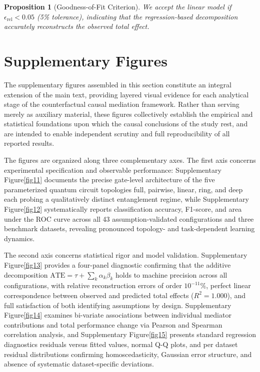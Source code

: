\documentclass[
    reprint,
    amsmath, amssymb,
    aps,
    floatfix,
    nofootinbib
]{revtex4-1}
\newtheorem{proposition}{Proposition}
\begin{document}
\begin{proposition}[Goodness-of-Fit Criterion]
We accept the linear model if $\epsilon_{\text{rel}} < 0.05$ (5\% tolerance), indicating that the regression-based decomposition accurately reconstructs the observed total effect.
\end{proposition}

\section{Supplementary Figures}

The supplementary figures assembled in this section constitute 
an integral extension of the main text, providing layered visual evidence for each analytical stage of the counterfactual causal mediation framework. Rather than serving merely as auxiliary material, these figures collectively establish the empirical and statistical foundations upon which the causal conclusions of the study rest, and are intended to enable independent scrutiny and full reproducibility of all reported results.

The figures are organized along three complementary axes. 
The first axis concerns experimental specification and 
observable performance: Supplementary Figure\ref{fig11} documents 
the precise gate-level architecture of the five parameterized 
quantum circuit topologies full, pairwise, linear, ring, 
and deep  each probing a qualitatively distinct entanglement 
regime, while Supplementary Figure\ref{fig12} systematically reports 
classification accuracy, F1-score, and area under the ROC 
curve across all 43 assumption-validated configurations and 
three benchmark datasets, revealing pronounced topology- and 
task-dependent learning dynamics.

The second axis concerns statistical rigor and model 
validation. Supplementary Figure\ref{fig13} provides a four-panel 
diagnostic confirming that the additive decomposition 
$\mathrm{ATE} = \tau + \sum_k \alpha_k \beta_k$ holds 
to machine precision across all configurations, with 
relative reconstruction errors of order $10^{-11}\%$, 
perfect linear correspondence between observed and 
predicted total effects ($R^2 = 1.000$), and full 
satisfaction of both identifying assumptions by design. 
Supplementary Figure\ref{fig14} examines bi-variate associations 
between individual mediator contributions and total 
performance change via Pearson and Spearman correlation 
analysis, and Supplementary Figure\ref{fig15} presents standard 
regression diagnostics  residuals versus fitted values, 
normal Q-Q plots, and per dataset residual distributions  confirming homoscedasticity, Gaussian error structure, 
and absence of systematic dataset-specific deviations.
\end{document}
